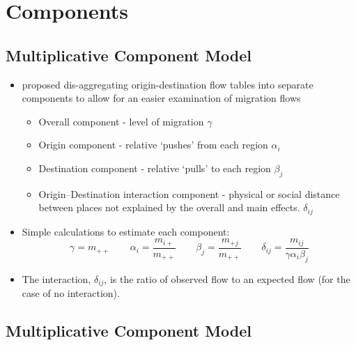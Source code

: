 \documentclass[
]{book}
\providecommand{\tightlist}{%
  \setlength{\itemsep}{0pt}\setlength{\parskip}{0pt}}
\begin{document}
\hypertarget{components}{%
\section{Components}\label{components}}

\hypertarget{multiplicative-component-model}{%
\subsection{Multiplicative Component Model}\label{multiplicative-component-model}}

\begin{itemize}
\tightlist
\item
  \citet{rogers2002dms} proposed dis-aggregating origin-destination flow tables into separate components to allow for an easier examination of migration flows

  \begin{itemize}
  \tightlist
  \item
    Overall component - level of migration \(\gamma\)
  \item
    Origin component - relative `pushes' from each region \(\alpha_i\)
  \item
    Destination component - relative `pulls' to each region \(\beta_j\)
  \item
    Origin--Destination interaction component - physical or social distance between places not explained by the overall and main effects. \(\delta_{ij}\)
  \end{itemize}
\item
  Simple calculations to estimate each component:
  \[
  \gamma = m_{++} \qquad \alpha_i = \dfrac{m_{i+}}{m_{++}} \qquad \beta_j = \dfrac{m_{+j}}{m_{++}} \qquad  \delta_{ij} = \dfrac{m_{ij}}{\gamma\alpha_i\beta_j}
  \]
\item
  The interaction, \(\delta_{ij}\), is the ratio of observed flow to an expected flow (for the case of no interaction).
\end{itemize}

\hypertarget{multiplicative-component-model-1}{%
\subsection{Multiplicative Component Model}\label{multiplicative-component-model-1}}
\end{document}

